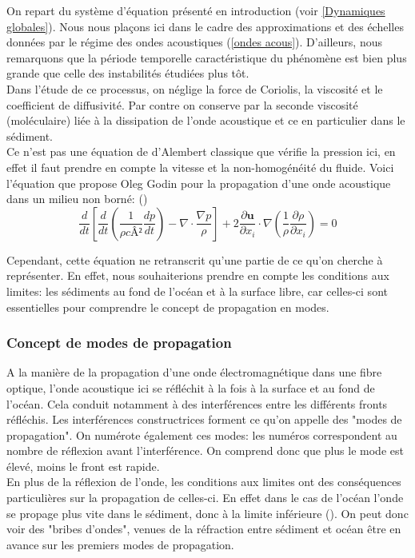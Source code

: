 \documentclass{rapportECC}
\begin{document}
On repart du système d'équation présenté en introduction (voir \ref{Dynamiques globales}). Nous nous plaçons ici dans le cadre des approximations et des échelles données par le régime des ondes acoustiques (\ref{ondes acous}). D'ailleurs, nous remarquons que la période temporelle caractéristique du phénomène est bien plus grande que celle des instabilités étudiées plus tôt.
\\
Dans l'étude de ce processus, on néglige la force de Coriolis, la viscosité et le coefficient de diffusivité. Par contre on conserve par la seconde viscosité (moléculaire) liée à la dissipation de l'onde acoustique et ce en particulier dans le sédiment.
\\
Ce n'est pas une équation de d'Alembert classique que vérifie la pression ici, en effet il faut prendre en compte la vitesse et la non-homogénéité du fluide. Voici l'équation que propose Oleg Godin pour la propagation d'une onde acoustique dans un milieu non borné: (\cite{godin_wave_2011}) 
\begin{equation}
    \frac{d}{dt}[\frac{d}{dt}(\frac{1}{\rho cÂ²}\frac{dp}{dt}) - \nabla \cdot \frac{\nabla p}{\rho}] + 2\frac{\partial \mathbf{u}}{\partial x_i} \cdot \nabla (\frac{1}{\rho}\frac{\partial \rho}{\partial x_i}) = 0
\end{equation}

Cependant, cette équation ne retranscrit qu'une partie de ce qu'on cherche à représenter. En effet, nous souhaiterions prendre en compte les conditions aux limites: les sédiments au fond de l'océan et à la surface libre, car celles-ci sont essentielles pour comprendre le concept de propagation en modes. 

\subsubsection{Concept de modes de propagation}

A la manière de la propagation d'une onde électromagnétique dans une fibre optique, l'onde acoustique ici se réfléchit à la fois à la surface et au fond de l'océan. Cela conduit notamment à des interférences entre les différents fronts réfléchis. Les interférences constructrices forment ce qu'on appelle des "modes de propagation". On numérote également ces modes: les numéros correspondent au nombre de réflexion avant l'interférence. On comprend donc que plus le mode est élevé, moins le front est rapide.\\
En plus de la réflexion de l'onde, les conditions aux limites ont des conséquences particulières sur la propagation de celles-ci. En effet dans le cas de l'océan l'onde se propage plus vite dans le sédiment, donc à la limite inférieure (\cite{CL_acous_2015}). On peut donc voir des "bribes d'ondes", venues de la réfraction entre sédiment et océan être en avance sur les premiers modes de propagation.
\end{document}
